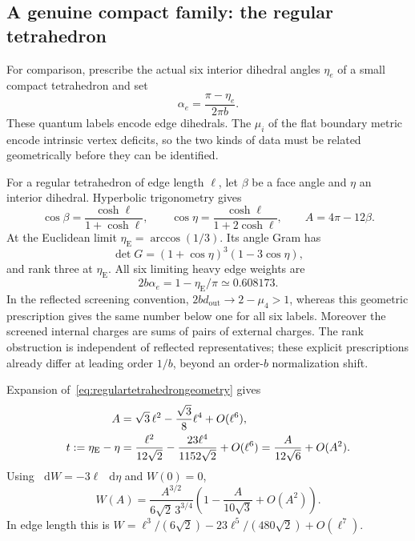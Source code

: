 \documentclass[11pt,a4paper]{article}
\numberwithin{equation}{section}
\theoremstyle{definition}
\theoremstyle{remark}
\newcommand{\dd}{\mathop{}\!\mathrm d}
\begin{document}
\subsection{A genuine compact family: the regular tetrahedron}

For comparison, prescribe the actual six interior dihedral
angles $\eta_e$ of a small compact tetrahedron and set
\begin{equation}
 \alpha_e=\frac{\pi-\eta_e}{2\pi b}.
 \label{eq:actualtetrahedralcharges}
\end{equation}
These quantum labels encode edge dihedrals. The $\mu_i$ of the
flat boundary metric encode intrinsic vertex deficits, so the
two kinds of data must be related geometrically before they
can be identified.

For a regular tetrahedron of edge length $\ell$, let $\beta$
be a face angle and $\eta$ an interior dihedral. Hyperbolic
trigonometry gives
\begin{equation}
 \cos\beta=\frac{\cosh\ell}{1+\cosh\ell},\qquad
 \cos\eta=\frac{\cosh\ell}{1+2\cosh\ell},\qquad
 A=4\pi-12\beta.
 \label{eq:regulartetrahedrongeometry}
\end{equation}
At the Euclidean limit
$\eta_{\mathrm E}=\arccos(1/3)$. Its angle Gram has
\[
 \det G=(1+\cos\eta)^3(1-3\cos\eta),
\]
and rank three at $\eta_{\mathrm E}$.
All six limiting heavy edge weights are
\[
 2b\alpha_e=1-\eta_{\mathrm E}/\pi\simeq0.608173.
\]
In the reflected screening convention,
$2bd_{\mathrm{out}}\to2-\mu_4>1$, whereas this geometric
prescription gives the same number below one for all six
labels. Moreover the screened internal charges are sums of
pairs of external charges. The rank obstruction is independent
of reflected representatives; these explicit prescriptions
already differ at leading order $1/b$, beyond an order-$b$
normalization shift.

Expansion of~\eqref{eq:regulartetrahedrongeometry} gives
\begin{align}
 A&=\sqrt3\,\ell^2-\frac{\sqrt3}{8}\ell^4+O(\ell^6),
 \notag\\
 t:=\eta_{\mathrm E}-\eta
   &=\frac{\ell^2}{12\sqrt2}
       -\frac{23\ell^4}{1152\sqrt2}+O(\ell^6)
     =\frac{A}{12\sqrt6}+O(A^2).
 \label{eq:regularareadihedral}
\end{align}
Using $\dd W=-3\ell\,\dd\eta$ and $W(0)=0$,
\begin{equation}
 \boxed{\quad
 W(A)=\frac{A^{3/2}}{6\sqrt2\,3^{3/4}}
       \left(1-\frac{A}{10\sqrt3}+O(A^2)\right).
 \quad}
 \label{eq:regularvolumebyarea}
\end{equation}
In edge length this is
$W=\ell^3/(6\sqrt2)-23\ell^5/(480\sqrt2)+O(\ell^7)$.
\end{document}
